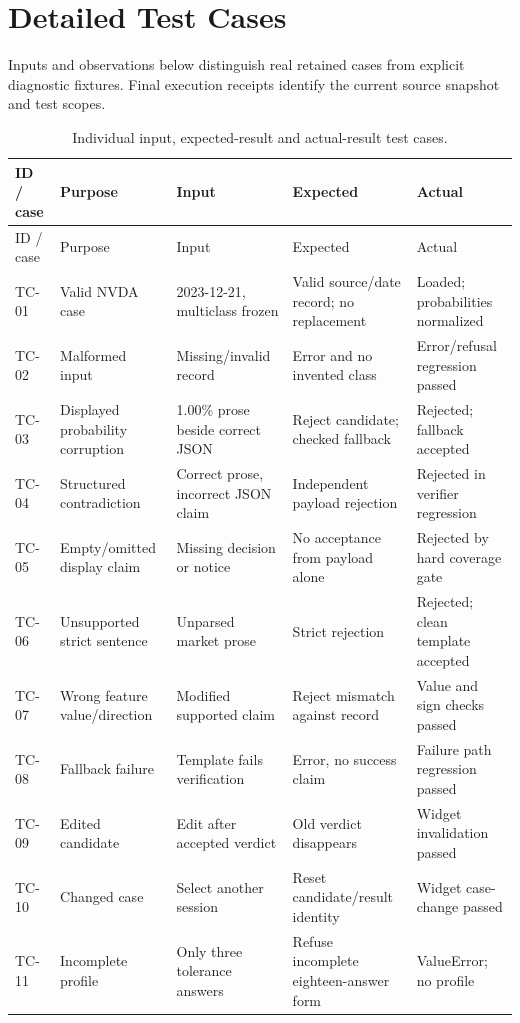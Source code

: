\chapter{Detailed Test Cases}
\label{app:tests}
Inputs and observations below distinguish real retained cases from explicit diagnostic fixtures. Final execution receipts identify the current source snapshot and test scopes.
\begingroup\small
\begin{longtable}{p{}p{}p{}p{}p{}}
\caption{Individual input, expected-result and actual-result test cases.}\label{tab:individual-tests}\\
\toprule ID / case & Purpose & Input & Expected & Actual\\\midrule
\endfirsthead
\toprule ID / case & Purpose & Input & Expected & Actual\\\midrule
\endhead
TC-01 & Valid NVDA case & 2023-12-21, multiclass frozen & Valid source/date record; no replacement & Loaded; probabilities normalized\\
TC-02 & Malformed input & Missing/invalid record & Error and no invented class & Error/refusal regression passed\\
TC-03 & Displayed probability corruption & 1.00\% prose beside correct JSON & Reject candidate; checked fallback & Rejected; fallback accepted\\
TC-04 & Structured contradiction & Correct prose, incorrect JSON claim & Independent payload rejection & Rejected in verifier regression\\
TC-05 & Empty/omitted display claim & Missing decision or notice & No acceptance from payload alone & Rejected by hard coverage gate\\
TC-06 & Unsupported strict sentence & Unparsed market prose & Strict rejection & Rejected; clean template accepted\\
TC-07 & Wrong feature value/direction & Modified supported claim & Reject mismatch against record & Value and sign checks passed\\
TC-08 & Fallback failure & Template fails verification & Error, no success claim & Failure path regression passed\\
TC-09 & Edited candidate & Edit after accepted verdict & Old verdict disappears & Widget invalidation passed\\
TC-10 & Changed case & Select another session & Reset candidate/result identity & Widget case-change passed\\
TC-11 & Incomplete profile & Only three tolerance answers & Refuse incomplete eighteen-answer form & ValueError; no profile\\

\end{longtable}
